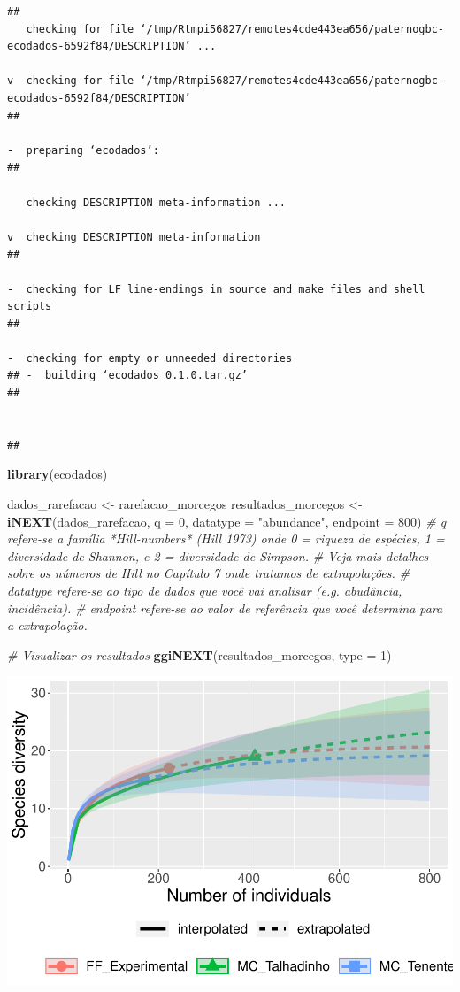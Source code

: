 \documentclass[
]{book}
\newenvironment{Shaded}{\begin{snugshade}}{\end{snugshade}}
\newcommand{\CommentTok}[1]{\textcolor[rgb]{0.56,0.35,0.01}{\textit{#1}}}
\newcommand{\DataTypeTok}[1]{\textcolor[rgb]{0.13,0.29,0.53}{#1}}
\newcommand{\DecValTok}[1]{\textcolor[rgb]{0.00,0.00,0.81}{#1}}
\newcommand{\KeywordTok}[1]{\textcolor[rgb]{0.13,0.29,0.53}{\textbf{#1}}}
\newcommand{\NormalTok}[1]{#1}
\newcommand{\StringTok}[1]{\textcolor[rgb]{0.31,0.60,0.02}{#1}}
\begin{document}
\begin{verbatim}
##   
   checking for file ‘/tmp/Rtmpi56827/remotes4cde443ea656/paternogbc-ecodados-6592f84/DESCRIPTION’ ...
  
v  checking for file ‘/tmp/Rtmpi56827/remotes4cde443ea656/paternogbc-ecodados-6592f84/DESCRIPTION’
## 
  
-  preparing ‘ecodados’:
## 
  
   checking DESCRIPTION meta-information ...
  
v  checking DESCRIPTION meta-information
## 
  
-  checking for LF line-endings in source and make files and shell scripts
## 
  
-  checking for empty or unneeded directories
## -  building ‘ecodados_0.1.0.tar.gz’
## 
  
   
## 
\end{verbatim}

\begin{Shaded}
\begin{Highlighting}[]
\KeywordTok{library}\NormalTok{(ecodados)}

\NormalTok{dados_rarefacao <-}\StringTok{ }\NormalTok{rarefacao_morcegos}
\NormalTok{resultados_morcegos <-}\StringTok{ }\KeywordTok{iNEXT}\NormalTok{(dados_rarefacao, }\DataTypeTok{q =} \DecValTok{0}\NormalTok{, }\DataTypeTok{datatype =} \StringTok{"abundance"}\NormalTok{, }\DataTypeTok{endpoint =} \DecValTok{800}\NormalTok{)}
\CommentTok{# q refere-se a família *Hill-numbers* (Hill 1973) onde 0 = riqueza de espécies, 1 =  diversidade de Shannon, e 2 = diversidade de Simpson.}
\CommentTok{# Veja mais detalhes sobre os números de Hill no Capítulo 7 onde tratamos de extrapolações.}
\CommentTok{# datatype refere-se ao tipo de dados que você vai analisar (e.g. abudância, incidência).}
\CommentTok{# endpoint refere-se ao valor de referência que você determina para a extrapolação.}

\CommentTok{# Visualizar os resultados }
\KeywordTok{ggiNEXT}\NormalTok{(resultados_morcegos, }\DataTypeTok{type =} \DecValTok{1}\NormalTok{)}
\end{Highlighting}
\end{Shaded}

\includegraphics{livro_r_ecologia_files/figure-latex/unnamed-chunk-40-1.pdf}
\end{document}
